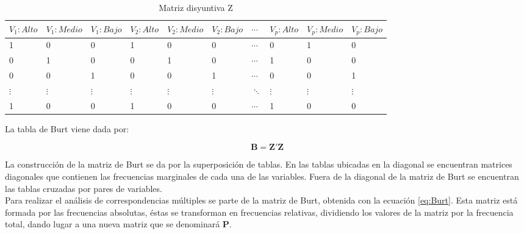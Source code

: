 \documentclass[water,article,submit,moreauthors,pdftex]{mdpi}
\begin{document}
\begin{table}[!ht]
\begin{center}
 \begin{tabular}{||p{1cm}p{1cm}p{1cm}||p{1cm}p{1cm} p{1cm} ||p{1cm} ||p{1cm} p{1cm} p{1cm} ||} 
 \hline
 $V_{1}:Alto$ &$V_{1}:Medio$ &$V_{1}:Bajo$ & $V_{2}:Alto$ & $V_{2}:Medio$ & $V_{2}:Bajo$ & $\cdots$ & $V_{p}:Alto$ & $V_{p}:Medio$ & $V_{p}:Bajo$ \\ [0.5ex] 
 \hline\hline
 1 & 0 & 0 & 1 & 0 & 0 & $\cdots$ & 0 & 1 & 0 \\ [0.2ex] 
 \hline
 0 & 1 & 0 & 0 & 1 & 0 & $\cdots$ & 1 & 0 & 0 \\ 
\hline
 0 & 0 & 1 & 0 & 0 &  1 & $\cdots$ & 0 & 0 & 1 \\ 
\hline
 $\vdots$ & $\vdots$ & $\vdots$ & $\vdots$ & $\vdots$ &  $\vdots$ & $\ddots$ & $\vdots$ & $\vdots$ & $\vdots$ \\ 
\hline
 1 & 0 & 0 & 1 & 0 & 0 & $\cdots$ &1 & 0 & 0 \\  
 \hline
\end{tabular}
\caption{Matriz disyuntiva Z}
\label{tab:z}
\end{center}
\end{table}

La tabla de Burt viene dada por:

\begin{equation}
\mathbf{B}=\mathbf{Z'}\mathbf{Z}
\label{eq:Burt}
\end{equation}

La construcción de la matriz de Burt se da por la superposición de
tablas. En las tablas ubicadas en la diagonal se encuentran matrices
diagonales que contienen las frecuencias marginales de cada una de las
variables. Fuera de la diagonal de la matriz de Burt se encuentran las
tablas cruzadas por pares de variables.\\
Para realizar el análisis de correspondencias múltiples se parte de la
matriz de Burt, obtenida con la ecuación \ref{eq:Burt}. Esta matriz está
formada por las frecuencias absolutas, éstas se transforman en
frecuencias relativas, dividiendo los valores de la matriz por la
frecuencia total, dando lugar a una nueva matriz que se denominará
\textbf{P}.
\end{document}
